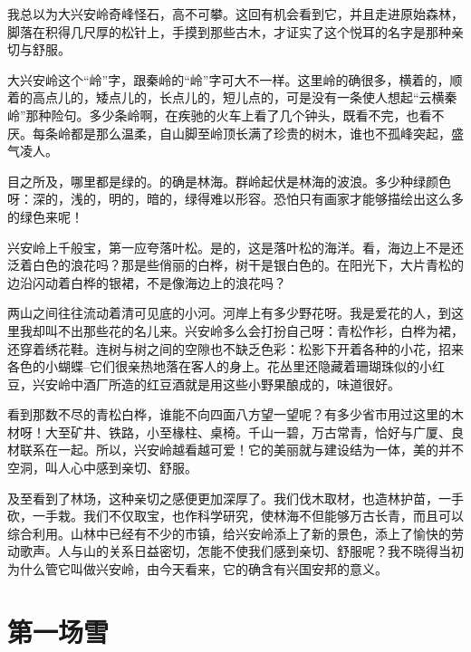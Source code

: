 \documentclass[12pt,UTF-8,openany]{ctexbook}
\begin{document}
\begin{large}
    
    我总以为大兴安岭奇峰怪石，高不可攀。这回有机会看到它，并且走进原始森林，脚落在积得几尺厚的松针上，手摸到那些古木，才证实了这个悦耳的名字是那种亲切与舒服。
    
    大兴安岭这个“岭”字，跟秦岭的“岭”字可大不一样。这里岭的确很多，横着的，顺着的高点儿的，矮点儿的，长点儿的，短儿点的，可是没有一条使人想起“云横秦岭”那种险句。多少条岭啊，在疾驰的火车上看了几个钟头，既看不完，也看不厌。每条岭都是那么温柔，自山脚至岭顶长满了珍贵的树木，谁也不孤峰突起，盛气凌人。
    
    目之所及，哪里都是绿的。的确是林海。群岭起伏是林海的波浪。多少种绿颜色呀：深的，浅的，明的，暗的，绿得难以形容。恐怕只有画家才能够描绘出这么多的绿色来呢！
    
    兴安岭上千般宝，第一应夸落叶松。是的，这是落叶松的海洋。看，海边上不是还泛着白色的浪花吗？那是些俏丽的白桦，树干是银白色的。在阳光下，大片青松的边沿闪动着白桦的银裙，不是像海边上的浪花吗？
    
    两山之间往往流动着清可见底的小河。河岸上有多少野花呀。我是爱花的人，到这里我却叫不出那些花的名儿来。兴安岭多么会打扮自己呀：青松作衫，白桦为裙，还穿着绣花鞋。连树与树之间的空隙也不缺乏色彩：松影下开着各种的小花，招来各色的小蝴蝶--它们很亲热地落在客人的身上。花丛里还隐藏着珊瑚珠似的小红豆，兴安岭中酒厂所造的红豆酒就是用这些小野果酿成的，味道很好。
    
    看到那数不尽的青松白桦，谁能不向四面八方望一望呢？有多少省市用过这里的木材呀！大至矿井、铁路，小至椽柱、桌椅。千山一碧，万古常青，恰好与广厦、良材联系在一起。所以，兴安岭越看越可爱！它的美丽就与建设结为一体，美的并不空洞，叫人心中感到亲切、舒服。
    
    及至看到了林场，这种亲切之感便更加深厚了。我们伐木取材，也造林护苗，一手砍，一手栽。我们不仅取宝，也作科学研究，使林海不但能够万古长青，而且可以综合利用。山林中已经有不少的市镇，给兴安岭添上了新的景色，添上了愉快的劳动歌声。人与山的关系日益密切，怎能不使我们感到亲切、舒服呢？我不晓得当初为什么管它叫做兴安岭，由今天看来，它的确含有兴国安邦的意义。
    
\end{large}



\chapter{第一场雪}
\end{document}
